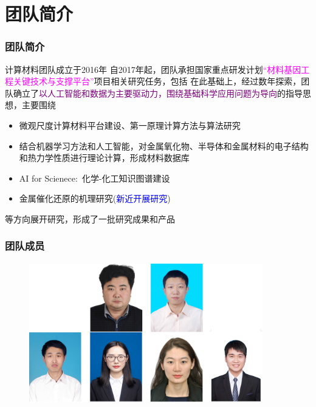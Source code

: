 \small
\section{团队简介}
\frame
{
	\frametitle{团队简介}
	计算材料团队成立于\textrm{2016}年
	\vskip 2pt 
	自\textrm{2017}年起，团队承担国家重点研发计划\textcolor{magenta}{``材料基因工程关键技术与支撑平台''}项目相关研究任务，包括
	{\fontsize{7.2pt}{6.2pt}\selectfont{\begin{itemize}
		\item \textcolor{blue}{高通量并发式材料计算算法和软件}
		\item \textcolor{blue}{高通量材料计算的工作流设计与交互图形化}
		\item \textcolor{blue}{材料基因工程数据汇交与管理服务技术平台}
	\end{itemize}}}
	在此基础上，经过数年探索，团队确立了\textcolor{purple}{以人工智能和数据为主要驱动力，围绕基础科学应用问题为导向}的指导思想，主要围绕
	\begin{itemize}
		\item 微观尺度计算材料平台建设、第一原理计算方法与算法研究
		\item 结合机器学习方法和人工智能，对金属氧化物、半导体和金属材料的电子结构和热力学性质进行理论计算，形成材料数据库
		\item \textrm{AI for Scienece}:~化学-化工知识图谱建设
		\item 金属催化\textrm{}还原的机理研究(\textcolor{blue}{新近开展研究})
	\end{itemize}
	等方向展开研究，形成了一批研究成果和产品
}

\frame
{
	\frametitle{团队成员}
\begin{figure}[h!]
\vspace*{-0.10in}
\centering
\includegraphics[height=2.40in,width=4.00in,viewport=0 0 430 270,clip]{Figures/Team_Member.png}
\label{Team_Membwe}
\end{figure}
}

